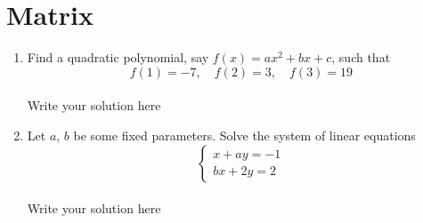 \documentclass[a4paper]{article}
\begin{document}






% 
% 

%

%

% 
% 
\section{Matrix}

\begin{enumerate}
    \item Find a quadratic polynomial, say $f(x) = ax^2 + bx + c$, such that
    \[
    f(1) = -7, \quad f(2) = 3, \quad f(3) = 19
    \]
    \hrulefill\\
    Write your solution here
    
    
    \item Let $a$, $b$ be some fixed parameters. Solve the system of linear equations
    \[
    \begin{cases*}
    x + ay = -1 \\
    bx + 2y = 2
    \end{cases*}
    \]
    \hrulefill\\
    Write your solution here
        
\end{enumerate}

% 
% 
\clearpage
\end{document}
